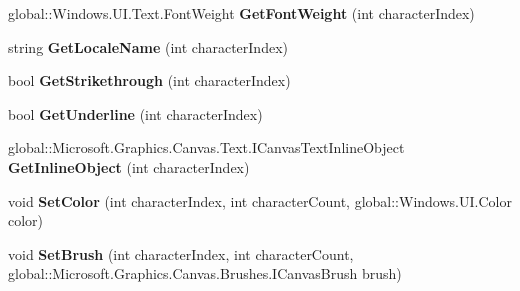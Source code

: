 \begin{DoxyCompactItemize}
global\+::\+Windows.\+U\+I.\+Text.\+Font\+Weight {\bfseries Get\+Font\+Weight} (int character\+Index)
\item 
\mbox{\label{interface_microsoft_1_1_graphics_1_1_canvas_1_1_text_1_1_i_canvas_text_layout_a7e47ecf579b7325816baa2b6f0d4a445}} 
string {\bfseries Get\+Locale\+Name} (int character\+Index)
\item 
\mbox{\label{interface_microsoft_1_1_graphics_1_1_canvas_1_1_text_1_1_i_canvas_text_layout_a54992433dbfe37955d7dc9c961efac12}} 
bool {\bfseries Get\+Strikethrough} (int character\+Index)
\item 
\mbox{\label{interface_microsoft_1_1_graphics_1_1_canvas_1_1_text_1_1_i_canvas_text_layout_a1fed7002196c925fdb32159912639cab}} 
bool {\bfseries Get\+Underline} (int character\+Index)
\item 
\mbox{\label{interface_microsoft_1_1_graphics_1_1_canvas_1_1_text_1_1_i_canvas_text_layout_adbed17232322b4f7cb159ed09f3ed328}} 
global\+::\+Microsoft.\+Graphics.\+Canvas.\+Text.\+I\+Canvas\+Text\+Inline\+Object {\bfseries Get\+Inline\+Object} (int character\+Index)
\item 
\mbox{\label{interface_microsoft_1_1_graphics_1_1_canvas_1_1_text_1_1_i_canvas_text_layout_abf05e047c6100a7211eb7e3412bb3762}} 
void {\bfseries Set\+Color} (int character\+Index, int character\+Count, global\+::\+Windows.\+U\+I.\+Color color)
\item 
\mbox{\label{interface_microsoft_1_1_graphics_1_1_canvas_1_1_text_1_1_i_canvas_text_layout_a7f915acfc4ff40f7d367cb38220d6cbd}} 
void {\bfseries Set\+Brush} (int character\+Index, int character\+Count, global\+::\+Microsoft.\+Graphics.\+Canvas.\+Brushes.\+I\+Canvas\+Brush brush)
\item 
\mbox{\label{interface_microsoft_1_1_graphics_1_1_canvas_1_1_text_1_1_i_canvas_text_layout_aeddfc3e7e513bcfa6c67e5a5139a3558}} 

\end{DoxyCompactItemize}
